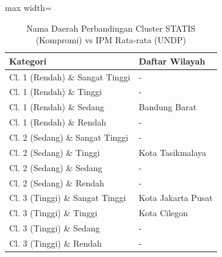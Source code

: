\begin{table}[H]
\centering
\caption{Nama Daerah Perbandingan Cluster STATIS (Kompromi) vs IPM Rata-rata (UNDP)} \makeatletter{}\makeatother
\begin{adjustbox}{max width=\textwidth}
\begin{tabular}{|p{4cm}|p{10cm}|}
\hline
\textbf{Kategori} & \textbf{Daftar Wilayah} \\
\hline
Cl. 1 (Rendah) \& Sangat Tinggi & - \\
\hline
Cl. 1 (Rendah) \& Tinggi & - \\
\hline
Cl. 1 (Rendah) \& Sedang & Bandung Barat \\
\hline
Cl. 1 (Rendah) \& Rendah & - \\
\hline
Cl. 2 (Sedang) \& Sangat Tinggi & - \\
\hline
Cl. 2 (Sedang) \& Tinggi & Kota Tasikmalaya \\
\hline
Cl. 2 (Sedang) \& Sedang & - \\
\hline
Cl. 2 (Sedang) \& Rendah & - \\
\hline
Cl. 3 (Tinggi) \& Sangat Tinggi & Kota Jakarta Pusat \\
\hline
Cl. 3 (Tinggi) \& Tinggi & Kota Cilegon \\
\hline
Cl. 3 (Tinggi) \& Sedang & - \\
\hline
Cl. 3 (Tinggi) \& Rendah & - \\
\hline
\end{tabular}
\end{adjustbox}
\end{table}
